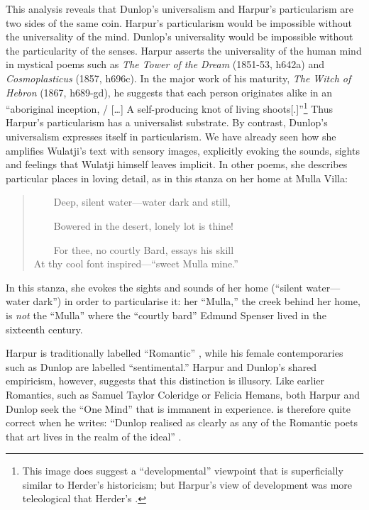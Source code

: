 \documentclass[
  Crown,
  times,
  sageh]{sagej}
\begin{document}
This analysis reveals that Dunlop's universalism and Harpur's
particularism are two sides of the same coin. Harpur's particularism
would be impossible without the universality of the mind. Dunlop's
universality would be impossible without the particularity of the
senses. Harpur asserts the universality of the human mind in mystical
poems such as \emph{The Tower of the Dream} (1851-53, h642a) and
\emph{Cosmoplasticus} (1857, h696c). In the major work of his maturity,
\emph{The Witch of Hebron} (1867, h689-gd), he suggests that each person
originates alike in an ``aboriginal inception, / {[}\ldots{]} A
self-producing knot of living shoots{[}.{]}''\footnote{This image does
  suggest a ``developmental'' viewpoint that is superficially similar to
  Herder's historicism; but Harpur's view of development was more
  teleological that Herder's \citep[6-10]{falk_endless_2019}.} Thus
Harpur's particularism has a universalist substrate. By contrast,
Dunlop's universalism expresses itself in particularism. We have already
seen how she amplifies Wulatji's text with sensory images, explicitly
evoking the sounds, sights and feelings that Wulatji himself leaves
implicit. In other poems, she describes particular places in loving
detail, as in this stanza on her home at Mulla Villa:

\begin{quote}
~~~~Deep, silent water---water dark and still,\\
\strut ~~~~Bowered in the desert, lonely lot is thine!\\
\strut ~~~~For thee, no courtly Bard, essays his skill\\
At thy cool font inspired---``sweet Mulla mine.''
\citep[198]{dunlop_selection_2021}
\end{quote}

In this stanza, she evokes the sights and sounds of her home (``silent
water---water dark'') in order to particularise it: her ``Mulla,'' the
creek behind her home, is \emph{not} the ``Mulla'' where the ``courtly
bard'' Edmund Spenser lived in the sixteenth century.

Harpur is traditionally labelled ``Romantic''
\citep[e.g.~by][]{kane_australian_1996, harpur_general_1987}, while his
female contemporaries such as Dunlop are labelled ``sentimental.''
Harpur and Dunlop's shared empiricism, however, suggests that this
distinction is illusory. Like earlier Romantics, such as Samuel Taylor
Coleridge or Felicia Hemans, both Harpur and Dunlop seek the ``One
Mind'' that is immanent in experience. \citet[69]{wu_morning_2021} is
therefore quite correct when he writes: ``Dunlop realised as clearly as
any of the Romantic poets that art lives in the realm of the ideal''
\citetext{\citealp[see
also][109]{minter_settlement_2021}; \citealp[79]{hansord_imperial_2021}}.
\end{document}
